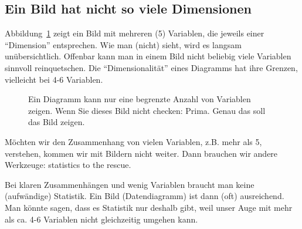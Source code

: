 \documentclass[
  letterpaper,
]{scrbook}
\theoremstyle{definition}
\theoremstyle{definition}
\theoremstyle{definition}
\theoremstyle{remark}
\begin{document}
\subsection{Ein Bild hat nicht so viele
Dimensionen}\label{ein-bild-hat-nicht-so-viele-dimensionen}

Abbildung~\ref{fig-many-dims} zeigt ein Bild mit mehreren (5) Variablen,
die jeweils einer ``Dimension'' entsprechen. Wie man (nicht) sieht, wird
es langsam unübersichtlich. Offenbar kann man in einem Bild nicht
beliebig viele Variablen sinnvoll reinquetschen. Die ``Dimensionalität''
eines Diagramms hat ihre Grenzen, vielleicht bei 4-6 Variablen.

\begin{figure}


\caption{\label{fig-many-dims}Ein Diagramm kann nur eine begrenzte
Anzahl von Variablen zeigen. Wenn Sie dieses Bild nicht checken: Prima.
Genau das soll das Bild zeigen.}

\end{figure}%

Möchten wir den Zusammenhang von vielen Variablen, z.B. mehr als 5,
verstehen, kommen wir mit Bildern nicht weiter. Dann brauchen wir andere
Werkzeuge: statistics to the rescue.

\begin{tcolorbox}[enhanced jigsaw, colbacktitle=quarto-callout-note-color!10!white, coltitle=black, bottomrule=.15mm, rightrule=.15mm, arc=.35mm, toptitle=1mm, colframe=quarto-callout-note-color-frame, opacitybacktitle=0.6, left=2mm, leftrule=.75mm, breakable, opacityback=0, bottomtitle=1mm, titlerule=0mm, title=\textcolor{quarto-callout-note-color}{\faInfo}\hspace{0.5em}{Hinweis}, colback=white, toprule=.15mm]

Bei klaren Zusammenhängen und wenig Variablen braucht man keine
(aufwändige) Statistik. Ein Bild (Datendiagramm) ist dann (oft)
ausreichend. Man könnte sagen, dass es Statistik nur deshalb gibt, weil
unser Auge mit mehr als ca. 4-6 Variablen nicht gleichzeitig umgehen
kann.

\end{tcolorbox}
\end{document}
